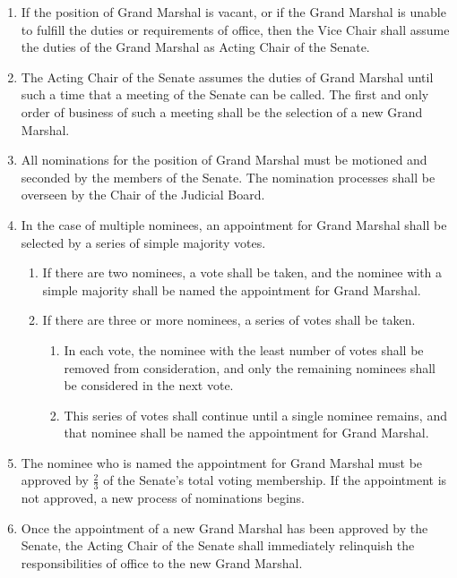 \begin{enumerate}
    \item If the position of Grand Marshal is vacant, or if the Grand Marshal is unable to fulfill the duties or requirements of office, then the Vice Chair shall assume the duties of the Grand Marshal as Acting Chair of the Senate.

    \item The Acting Chair of the Senate assumes the duties of Grand Marshal until such a time that a meeting of the Senate can be
    called. The first and only order of business of such a meeting shall be the selection of a new Grand Marshal.

    \item All nominations for the position of Grand Marshal must be motioned and seconded by the members of the Senate. The
    nomination processes shall be overseen by the Chair of the Judicial Board.

    \item In the case of multiple nominees, an appointment for Grand Marshal shall be selected by a series of simple majority votes.
    \begin{enumerate}
        \item If there are two nominees, a vote shall be taken, and the nominee with a simple majority shall be named the appointment
        for Grand Marshal.

        \item If there are three or more nominees, a series of votes shall be taken.
        \begin{enumerate}
            \item In each vote, the nominee with the least number of votes shall be removed from consideration, and only the remaining
            nominees shall be considered in the next vote.

            \item This series of votes shall continue until a single nominee remains, and that nominee shall be named the appointment for
            Grand Marshal.
        \end{enumerate}
    \end{enumerate}

    \item The nominee who is named the appointment for Grand Marshal must be approved by $\frac{2}{3}$ of the Senate’s total voting membership. If the appointment is not approved, a new process of nominations begins.
    \item Once the appointment of a new Grand Marshal has been approved by the Senate, the Acting Chair of the Senate shall immediately relinquish the responsibilities of office to the new Grand Marshal.

\end{enumerate}
